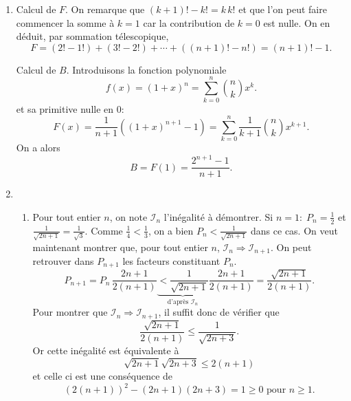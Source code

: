 \begin{enumerate}
  \item Calcul de $F$. On remarque que $(k+1)! - k! = k\,k!$ et que l'on peut faire commencer la somme à $k=1$ car la contribution de $k=0$ est nulle. On en déduit, par sommation télescopique,
\begin{displaymath}
  F =(2! -1!) + (3! - 2!) + \cdots + ((n+1)! -n!) = (n+1)! -1.
\end{displaymath}

Calcul de $B$. Introduisons la fonction polynomiale
\begin{displaymath}
  f(x) = (1+x)^n = \sum_{k=0}^{n}\binom{n}{k}x^k.
\end{displaymath}
et sa primitive nulle en $0$:
\begin{displaymath}
  F(x) = \frac{1}{n+1}\left( (1+x)^{n+1} -1\right) = \sum_{k=0}^{n}\frac{1}{k+1}\binom{n}{k}x^{k+1} .
\end{displaymath}
On a alors
\begin{displaymath}
  B = F(1) = \frac{2^{n+1}-1}{n+1}.
\end{displaymath}

  \item 
\begin{enumerate}
  \item Pour tout entier $n$, on note $\mathcal{I}_n$ l'inégalité à démontrer.\newline
Si $n= 1: \; P_n = \frac{1}{2}$ et $\frac{1}{\sqrt{2n+1}} = \frac{1}{\sqrt{3}}$. Comme $\frac{1}{4}< \frac{1}{3}$, on a bien $P_n < \frac{1}{\sqrt{2n+1}}$ dans ce cas.\newline
On veut maintenant montrer que, pour tout entier $n$, $\mathcal{I}_n \Rightarrow \mathcal{I}_{n+1}$. On peut retrouver dans $P_{n+1}$ les facteurs constituant $P_n$.
\begin{displaymath}
  P_{n+1} = P_n \,\frac{2n+1}{2(n+1)} \underset{\text{d'après }\mathcal{I}_n}{\underbrace{< \frac{1}{\sqrt{2n+1}}}} \frac{2n+1}{2(n+1)}
  = \frac{\sqrt{2n+1}}{2(n+1)} .
\end{displaymath}
Pour montrer que $\mathcal{I}_n \Rightarrow \mathcal{I}_{n+1}$, il suffit donc de vérifier que
\begin{displaymath}
  \frac{\sqrt{2n+1}}{2(n+1)} \leq \frac{1}{\sqrt{2n+3}}.
\end{displaymath}
Or cette inégalité est équivalente à
\begin{displaymath}
  \sqrt{2n+1} \sqrt{2n+3} \leq 2(n+1)
\end{displaymath}
et celle ci est une conséquence de
\begin{displaymath}
  (2(n+1))^2 -(2n+1)(2n+3) = 1 \geq 0 \text{ pour } n\geq 1.
\end{displaymath}


\end{enumerate}
\end{enumerate}
